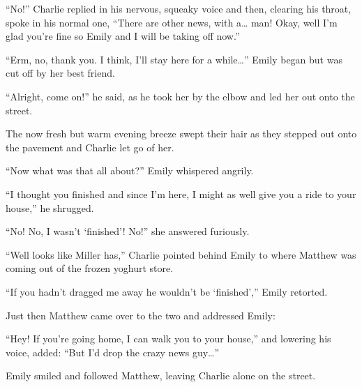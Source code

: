 “No!” Charlie replied in his nervous, squeaky voice and then, clearing his throat, spoke in his normal one, “There are other news, with a… man! Okay, well I’m glad you’re fine so Emily and I will be taking off now.”

“Erm, no, thank you. I think, I’ll stay here for a while…” Emily began but was cut off by her best friend.

“Alright, come on!” he said, as he took her by the elbow and led her out onto the street.

The now fresh but warm evening breeze swept their hair as they stepped out onto the pavement and Charlie let go of her.

“Now what was that all about?” Emily whispered angrily.

“I thought you finished and since I’m here, I might as well give you a ride to your house,” he shrugged.

“No! No, I wasn’t ‘finished’! No!” she answered furiously.

“Well looks like Miller has,” Charlie pointed behind Emily to where Matthew was coming out of the frozen yoghurt store.

“If you hadn’t dragged me away he wouldn’t be ‘finished’,” Emily retorted.

Just then Matthew came over to the two and addressed Emily:

“Hey! If you’re going home, I can walk you to your house,” and lowering his voice, added: “But I’d drop the crazy news guy…”

Emily smiled and followed Matthew, leaving Charlie alone on the street.